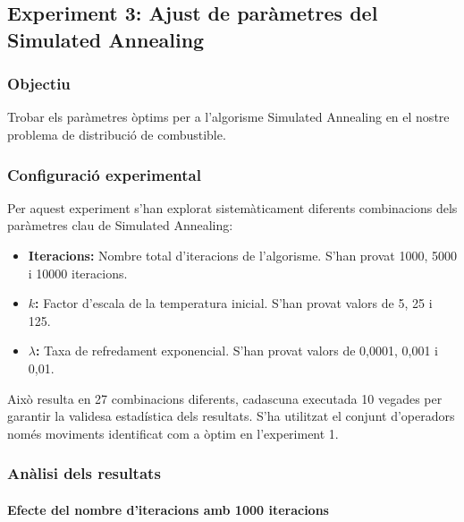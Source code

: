 \subsection{Experiment 3: Ajust de paràmetres del Simulated Annealing}

\vspace{0.75cm}

\subsubsection{Objectiu}
Trobar els paràmetres òptims per a l'algorisme Simulated Annealing en el nostre problema de distribució de combustible.

\subsubsection{Configuració experimental}

Per aquest experiment s'han explorat sistemàticament diferents combinacions dels paràmetres clau de Simulated Annealing:

\begin{itemize}
    \item \textbf{Iteracions:} Nombre total d'iteracions de l'algorisme. S'han provat 1000, 5000 i 10000 iteracions.
    \item \textbf{$k$:} Factor d'escala de la temperatura inicial. S'han provat valors de 5, 25 i 125.
    \item \textbf{$\lambda$:} Taxa de refredament exponencial. S'han provat valors de 0,0001, 0,001 i 0,01.
\end{itemize}

Això resulta en 27 combinacions diferents, cadascuna executada 10 vegades per garantir la validesa estadística dels resultats. S'ha utilitzat el conjunt d'operadors només moviments identificat com a òptim en l'experiment 1.

\subsubsection{Anàlisi dels resultats}

\paragraph{Efecte del nombre d'iteracions amb 1000 iteracions}

\vspace{0.5cm}

\vspace{0.5cm}

